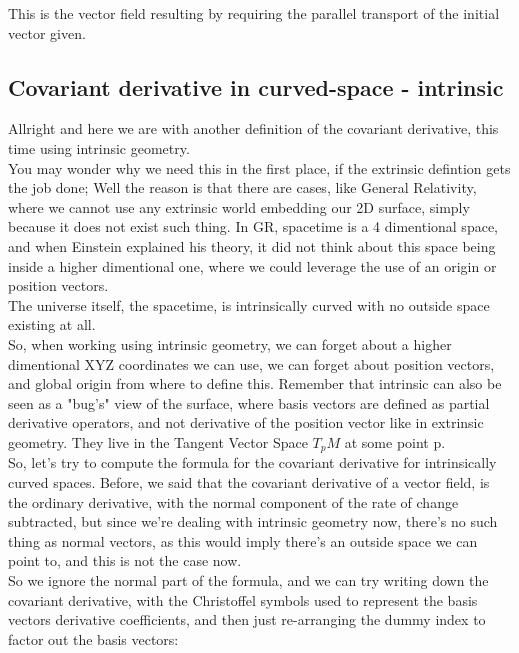 This is the vector field resulting by requiring the parallel transport of the initial vector given.\\

\subsection{Covariant derivative in curved-space - intrinsic}

Allright and here we are with another definition of the covariant derivative, this time using intrinsic geometry.\\
You may wonder why we need this in the first place, if the extrinsic defintion gets the job done; Well the reason is that there are 
cases, like General Relativity, where we cannot use any extrinsic world embedding our 2D surface, simply because it does not exist such thing.
In GR, spacetime is a 4 dimentional space, and when Einstein explained his theory, it did not think about this space being inside a higher dimentional one, 
where we could leverage the use of an origin or position vectors.\\
The universe itself, the spacetime, is intrinsically curved with no outside space existing at all.\\

So, when working using intrinsic geometry, we can forget about a higher dimentional XYZ coordinates we can use, we can 
forget about position vectors, and global origin from where to define this.
Remember that intrinsic can also be seen as a "bug's" view of the surface, where basis vectors
are defined as partial derivative operators, and not derivative of the position vector like in extrinsic geometry.
They live in the Tangent Vector Space $T_pM$ at some point p.\\

So, let's try to compute the formula for the covariant derivative for intrinsically curved spaces. Before, we said that
the covariant derivative of a vector field, is the ordinary derivative, with the normal component of the rate of change subtracted, but since
we're dealing with intrinsic geometry now, there's no such thing as normal vectors, as this would imply there's an outside space 
we can point to, and this is not the case now.\\

So we ignore the normal part of the formula, and we can try writing down the covariant derivative, with the Christoffel symbols used to represent
the basis vectors derivative coefficients, and then just re-arranging the dummy index to factor out the basis vectors:

